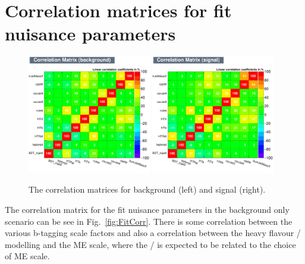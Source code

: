 \appendix
\chapter{Correlation matrices for fit nuisance parameters}


\begin{figure}[ht!]
    \includegraphics[width=0.48\textwidth]{images/Run2/CorrelationMatrixB.pdf}
    \includegraphics[width=0.48\textwidth]{images/Run2/CorrelationMatrixS.pdf}
    \caption{The correlation matrices for background (left) and signal (right).}
    \label{fig:corrMat}
\end{figure}

The correlation matrix for the fit nuisance parameters in the background only scenario can be see in Fig.~\ref{fig:FitCorr}. There is some correlation between the various b-tagging scale factors and also a correlation between the heavy flavour \heavyflavourone / \heavyflavourtwo modelling and the \ttbar ME scale, where the \heavyflavourone / \heavyflavourtwo is expected to be related to the choice of ME scale.


